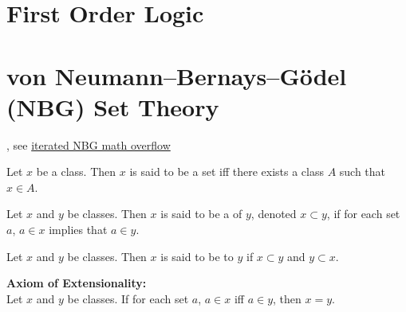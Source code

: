 \documentclass{book}
\begin{document}
	\section{First Order Logic}
	
	
	
	
	
	
	
	
	
	
	
	
	
	
	
	
	
	
	
	
	
	
	
	
	
	
	
	
	
	
	
	
	
	
	
	
	
	
	
	
	
	
	
	\section{von Neumann–Bernays–Gödel (NBG) Set Theory}
	
	, see \href{https://mathoverflow.net/questions/51257/can-zfc-%E2%86%92-nbg-be-iterated}{iterated NBG math overflow}
	
	\begin{defn}  
		Let $x$ be a class. Then $x$ is said to be a set iff there exists a class $A$ such that $x \in A$. 
	\end{defn}

	\begin{defn}
		Let $x$ and $y$ be classes. Then $x$ is said to be a  of $y$, denoted $x \subset y$, if for each set $a$, $a \in x$ implies that $a \in y$. 
	\end{defn}

	\begin{defn}
		Let $x$ and $y$ be classes. Then $x$ is said to be  to $y$ if $x \subset y$ and $y \subset x$. 
	\end{defn}

	\begin{ax}  \textbf{Axiom of Extensionality:}  \\
		Let $x$ and $y$ be classes. If for each set $a$, $a \in x$ iff $a \in y$, then $x = y$.
	\end{ax}
	
\end{document}
